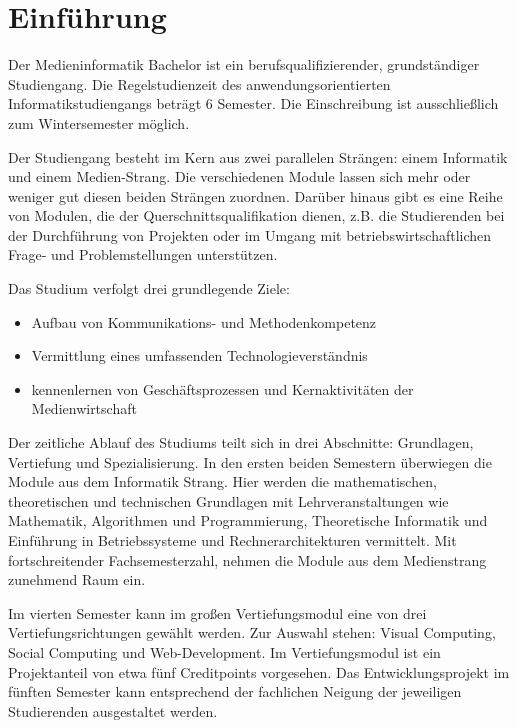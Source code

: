 \chapter{Einführung\label{/mi-2017/modulbeschreibungen-bachelor/einfuehrung}}\label{einfuxfchrungpathlabelmi-2017modulbeschreibungen-bacheloreinfuehrung}

Der Medieninformatik Bachelor ist ein berufsqualifizierender,
grundständiger Studiengang. Die Regelstudienzeit des
anwendungsorientierten Informatikstudiengangs beträgt 6 Semester. Die
Einschreibung ist ausschließlich zum Wintersemester möglich.

Der Studiengang besteht im Kern aus zwei parallelen Strängen: einem
Informatik und einem Medien-Strang. Die verschiedenen Module lassen sich
mehr oder weniger gut diesen beiden Strängen zuordnen. Darüber hinaus
gibt es eine Reihe von Modulen, die der Querschnittsqualifikation
dienen, z.B. die Studierenden bei der Durchführung von Projekten oder im
Umgang mit betriebswirtschaftlichen Frage- und Problemstellungen
unterstützen.

Das Studium verfolgt drei grundlegende Ziele:

\begin{itemize}
\tightlist
\item
  Aufbau von Kommunikations- und Methodenkompetenz
\item
  Vermittlung eines umfassenden Technologieverständnis
\item
  kennenlernen von Geschäftsprozessen und Kernaktivitäten der
  Medienwirtschaft
\end{itemize}

Der zeitliche Ablauf des Studiums teilt sich in drei Abschnitte:
Grundlagen, Vertiefung und Spezialisierung. In den ersten beiden
Semestern überwiegen die Module aus dem Informatik Strang. Hier werden
die mathematischen, theoretischen und technischen Grundlagen mit
Lehrveranstaltungen wie Mathematik, Algorithmen und Programmierung,
Theoretische Informatik und Einführung in Betriebssysteme und
Rechnerarchitekturen vermittelt. Mit fortschreitender Fachsemesterzahl,
nehmen die Module aus dem Medienstrang zunehmend Raum ein.

Im vierten Semester kann im großen Vertiefungsmodul eine von drei
Vertiefungsrichtungen gewählt werden. Zur Auswahl stehen: Visual
Computing, Social Computing und Web-Development. Im Vertiefungsmodul ist
ein Projektanteil von etwa fünf Creditpoints vorgesehen. Das
Entwicklungsprojekt im fünften Semester kann entsprechend der fachlichen
Neigung der jeweiligen Studierenden ausgestaltet werden.

